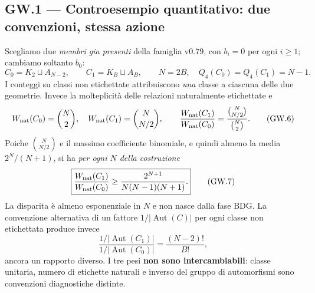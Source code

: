 \documentclass[11pt,a4paper]{article}
\begin{document}
\subsection*{GW.1 --- Controesempio quantitativo: due convenzioni, stessa azione}
Scegliamo due \emph{membri gia presenti} della famiglia v0.79, con $b_i=0$ per ogni $i\ge1$; cambiamo soltanto $b_0$:
\begin{equation}
 C_0=K_2\sqcup A_{N-2},\qquad C_1=K_B\sqcup A_B,
 \qquad N=2B,\quad Q_4(C_0)=Q_4(C_1)=N-1.\tag{GW.5}
\end{equation}
I conteggi su classi non etichettate attribuiscono \emph{una} classe a ciascuna delle due geometrie. Invece la molteplicit\`a delle relazioni naturalmente etichettate e
\begin{equation}
 W_{\rm nat}(C_0)=\binom N2,\quad
 W_{\rm nat}(C_1)=\binom N{N/2},\qquad
 \frac{W_{\rm nat}(C_1)}{W_{\rm nat}(C_0)}
 =\frac{\binom N{N/2}}{\binom N2}.
 \tag{GW.6}
\end{equation}
Poiche $\binom N{N/2}$ e il massimo coefficiente binomiale, e quindi almeno la media $2^N/(N+1)$, si ha \emph{per ogni $N$ della costruzione}
\begin{equation}
 \boxed{\frac{W_{\rm nat}(C_1)}{W_{\rm nat}(C_0)}
 \ge \frac{2^{N+1}}{N(N-1)(N+1)}.}
 \tag{GW.7}
\end{equation}
La disparita \`e almeno esponenziale in $N$ e non nasce dalla fase BDG. La convenzione alternativa di un fattore $1/|\operatorname{Aut}(C)|$ per ogni classe non etichettata produce invece
\begin{equation}
 \frac{1/|\operatorname{Aut}(C_1)|}{1/|\operatorname{Aut}(C_0)|}
 =\frac{(N-2)!}{B!},\tag{GW.8}
\end{equation}
ancora un rapporto diverso. I tre pesi \textbf{non sono intercambiabili}: classe unitaria, numero di etichette naturali e inverso del gruppo di automorfismi sono convenzioni diagnostiche distinte.
\end{document}
